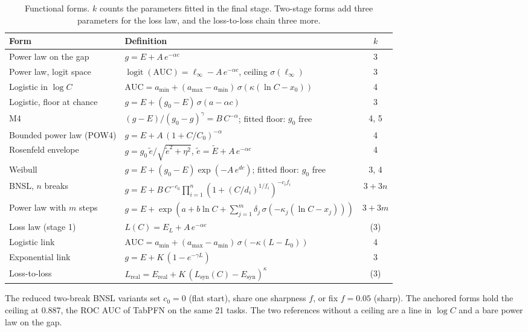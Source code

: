 \begin{table}[h]
  \centering
  \caption{Functional forms. $k$ counts the parameters fitted in the final stage. Two-stage forms add three parameters
  for the loss law, and the loss-to-loss chain three more.}
  \label{tab:forms-appendix}
  \footnotesize
  \setlength{\tabcolsep}{4pt}
  \begin{tabular}{llc}
    \toprule
    Form & Definition & $k$ \\
    \midrule
    Power law on the gap & $g = E + A\,e^{-\alpha c}$ & 3 \\
    Power law, logit space & $\operatorname{logit}(\text{AUC}) = \ell_\infty - A\,e^{-\alpha c}$, ceiling $\sigma(\ell_\infty)$ & 3 \\
    Logistic in $\log C$ & $\text{AUC} = a_{\min} + (a_{\max}-a_{\min})\,\sigma(\kappa(\ln C - x_0))$ & 4 \\
    Logistic, floor at chance & $g = E + (g_0-E)\,\sigma(a-\alpha c)$ & 3 \\
    M4 & $(g-E)/(g_0-g)^{\gamma} = B\,C^{-\alpha}$; fitted floor: $g_0$ free & 4, 5 \\
    Bounded power law (POW4) & $g = E + A\,(1+C/C_0)^{-\alpha}$ & 4 \\
    Rosenfeld envelope & $g = g_0\,\tilde e/\sqrt{\tilde e^2+\eta^2}$, $\tilde e = \tilde E + A\,e^{-\alpha c}$ & 4 \\
    Weibull & $g = E + (g_0-E)\exp(-A\,e^{d c})$; fitted floor: $g_0$ free & 3, 4 \\
    BNSL, $n$ breaks & $g = E + B\,C^{-c_0}\prod_{i=1}^{n}(1+(C/d_i)^{1/f_i})^{-c_i f_i}$ & $3+3n$ \\
    Power law with $m$ steps & $g = E + \exp(a + b\ln C + \textstyle\sum_{j=1}^{m} \delta_j\,\sigma(-\kappa_j(\ln C - x_j)))$ & $3+3m$ \\
    Loss law (stage 1) & $L(C) = E_L + A\,e^{-\alpha c}$ & (3) \\
    Logistic link & $\text{AUC} = a_{\min} + (a_{\max}-a_{\min})\,\sigma(-\kappa(L - L_0))$ & 4 \\
    Exponential link & $g = E + K\,(1-e^{-\gamma L})$ & 3 \\
    Loss-to-loss & $L_{\text{real}} = E_{\text{real}} + K\,(L_{\text{syn}}(C)-E_{\text{syn}})^{\kappa}$ & (3) \\
    \bottomrule
  \end{tabular}
\end{table}

The reduced two-break BNSL variants set $c_0=0$ (flat start), share one sharpness $f$, or fix $f=0.05$ (sharp). The
anchored forms hold the ceiling at 0.887, the ROC AUC of TabPFN on the same 21 tasks. The two references without a
ceiling are a line in $\log C$ and a bare power law on the gap.

